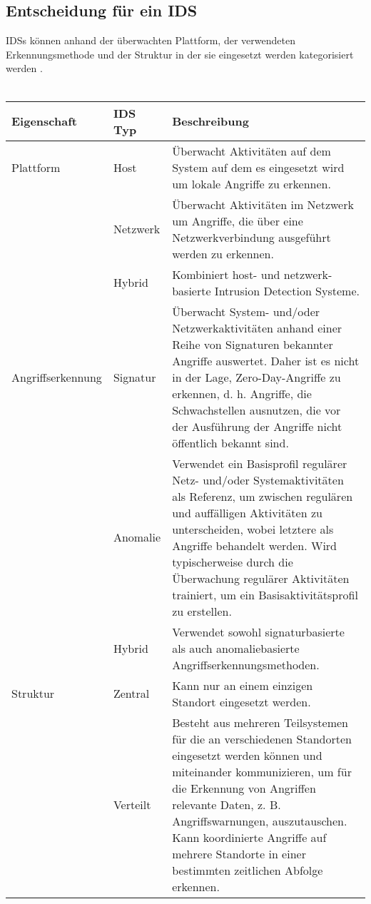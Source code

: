 \subsection{Entscheidung für ein IDS}
IDSs können anhand der überwachten Plattform, der verwendeten Erkennungsmethode und der Struktur in der sie eingesetzt werden kategorisiert werden \cite{milenkoski_evaluating_2015}.\\\\
\begin{tabularx}{\columnwidth}{l|l|l}
\hline
Eigenschaft 
& IDS Typ 
& Beschreibung\\
\hline
Plattform   
& Host     
& Überwacht Aktivitäten auf dem System auf dem es eingesetzt wird um lokale Angriffe zu erkennen. \\
& Netzwerk 
& Überwacht Aktivitäten im Netzwerk um Angriffe, die über eine Netzwerkverbindung ausgeführt werden zu erkennen.\\ 
& Hybrid   
& Kombiniert host- und netzwerk-basierte Intrusion Detection Systeme.\\
\hline
Angriffserkennung 
& Signatur        
& Überwacht System- und/oder Netzwerkaktivitäten anhand einer Reihe von Signaturen bekannter Angriffe auswertet. Daher ist es nicht in der Lage, Zero-Day-Angriffe zu erkennen, d. h. Angriffe, die Schwachstellen ausnutzen, die vor der Ausführung der Angriffe nicht öffentlich bekannt sind.\\
& Anomalie        
& Verwendet ein Basisprofil regulärer Netz- und/oder Systemaktivitäten als Referenz, um zwischen regulären und auffälligen Aktivitäten zu unterscheiden, wobei letztere als Angriffe behandelt werden. Wird typischerweise durch die Überwachung regulärer Aktivitäten trainiert, um ein Basisaktivitätsprofil zu erstellen.\\
& Hybrid          
& Verwendet sowohl signaturbasierte als auch anomaliebasierte Angriffserkennungsmethoden.\\ 
\hline
Struktur
& Zentral
& Kann nur an einem einzigen Standort eingesetzt werden.\\
& Verteilt
& Besteht aus mehreren Teilsystemen für die an verschiedenen Standorten eingesetzt werden können und miteinander kommunizieren, um für die Erkennung von Angriffen relevante Daten, z. B. Angriffswarnungen, auszutauschen. Kann koordinierte Angriffe auf mehrere Standorte in einer bestimmten zeitlichen Abfolge erkennen.\\
\hline
\end{tabularx}

